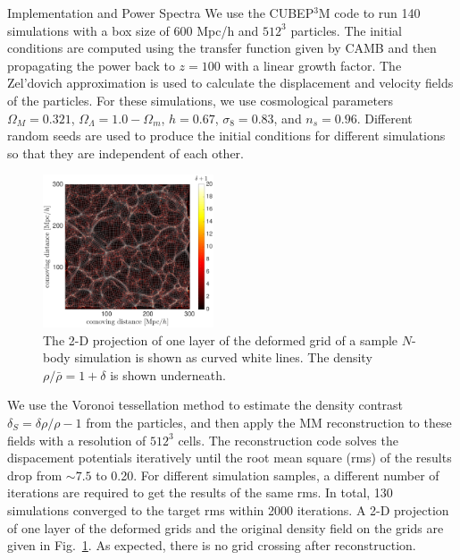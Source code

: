 \begin{section}{Implementation and Power Spectra}
  \label{sec:simulation}
  We use the \textsc{CUBEP$^3$M} code \cite{bib:Harnois2013} to run
  140 simulations with a box size of 600 Mpc/h and $512^3$ particles.
  The initial conditions are computed using the transfer function
  given by CAMB \cite{bib:Lewis2000} and then propagating the power
  back to $z=100$ with a linear growth factor.  The Zel'dovich
  approximation is used to calculate the displacement and velocity
  fields of the particles.  For these simulations, we use cosmological
  parameters $\Omega_M=0.321$, $\Omega_{\Lambda}=1.0-\Omega_m$,
  $h=0.67$, $\sigma_8=0.83$, and $n_s=0.96$.  Different random seeds
  are used to produce the initial conditions for different simulations
  so that they are independent of each other.

  \begin{figure}[h]
    \centering
    \includegraphics[width=0.45\textwidth]{fig1.pdf}
    \caption{ The 2-D projection of one layer of the deformed grid of a sample
      $N$-body simulation is shown as curved white lines.  The
      density $\rho/\bar{\rho}=1+\delta$ is shown
      underneath.}
    \label{fig:simandrec}
 \end{figure}

 We use the Voronoi tessellation method to estimate the density contrast
 $\delta_S=\delta\rho/\rho-1$ from the particles, and then apply the
 MM reconstruction to these fields with a resolution of $512^3$ cells.
 The reconstruction code solves the dispacement potentials iteratively
 until the root mean square (rms) of the results drop from $\sim 7.5$
 to 0.20. For different simulation samples, a different number of
 iterations are required to get the results of the same rms. In total,
 130 simulations converged to the target rms within 2000 iterations.  A 2-D projection
 of one layer of the deformed grids and the original density field on
 the grids are given in Fig.~\ref{fig:simandrec}.  As expected, there
 is no grid crossing after reconstruction.
 

\end{section}
